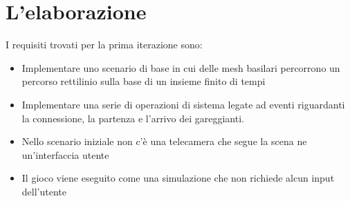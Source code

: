     

    \section{L'elaborazione}

        I requisiti trovati per la prima iterazione sono:
        \begin{itemize}[-]
            \item Implementare uno scenario di base in cui delle mesh basilari percorrono un percorso rettilinio sulla base di un insieme finito di tempi
            \item Implementare una serie di operazioni di sistema legate ad eventi riguardanti la connessione, la partenza e l'arrivo dei gareggianti.
            \item Nello scenario iniziale non c'è una telecamera che segue la scena ne un'interfaccia utente
            \item Il gioco viene eseguito come una simulazione che non richiede alcun input dell'utente
        \end{itemize}
